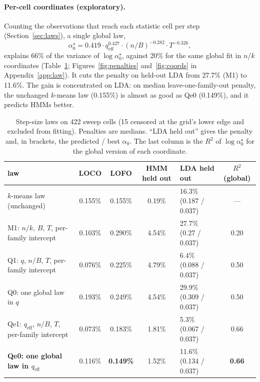 \documentclass[10pt]{article}
\newcommand{\aopt}{\alpha_0^{\star}}
\newcommand{\qeff}{q_{\mathrm{eff}}}
\begin{document}
\paragraph{Per-cell coordinates (exploratory).} Counting the observations that reach each statistic cell per step
(Section~\ref{sec:laws}), a single global law,
\begin{equation}
  \aopt = 0.419 \cdot \qeff^{0.427} \cdot (n/B)^{-0.282} \cdot T^{-0.326},
\end{equation}
explains 66\% of the variance of $\log\aopt$, against 20\% for the same global fit in $n/k$ coordinates
(Table~\ref{tab:laws}; Figures~\ref{fig:penalties} and~\ref{fig:coords} in Appendix~\ref{app:law}). It cuts the penalty on held-out LDA from
27.7\% (M1) to 11.6\%. The gain is concentrated on LDA: on median leave-one-family-out penalty, the unchanged
$k$-means law (0.155\%) is almost as good as Qe0 (0.149\%), and it predicts HMMs better.

\begin{table}[!htbp]
\centering\small
\caption{Step-size laws on 422 sweep cells (15 censored at the grid's lower edge and excluded from fitting).
Penalties are medians. ``LDA held out'' gives the penalty and, in brackets, the predicted / best $\alpha_0$. The last
column is the $R^2$ of $\log\aopt$ for the global version of each coordinate.}
\label{tab:laws}
\setlength{\tabcolsep}{4pt}
\begin{tabular}{p{4.6cm}cccp{3.0cm}c}
\toprule
law & LOCO & LOFO & HMM held out & LDA held out & $R^2$ (global) \\
\midrule
$k$-means law (unchanged) & 0.155\% & 0.155\% & 0.19\% & 16.3\% (0.187 / 0.037) & --- \\
M1: $n/k$, $B$, $T$, per-family intercept & 0.103\% & 0.290\% & 4.54\% & 27.7\% (0.27 / 0.037) & 0.20 \\
Q1: $q$, $n/B$, $T$, per-family intercept & 0.076\% & 0.225\% & 4.79\% & 6.4\% (0.088 / 0.037) & 0.50 \\
Q0: one global law in $q$ & 0.193\% & 0.249\% & 4.54\% & 29.9\% (0.309 / 0.037) & 0.50 \\
Qe1: $\qeff$, $n/B$, $T$, per-family intercept & 0.073\% & 0.183\% & 1.81\% & 5.3\% (0.067 / 0.037) & 0.66 \\
\textbf{Qe0: one global law in $\qeff$} & 0.116\% & \textbf{0.149\%} & 1.52\% & 11.6\% (0.134 / 0.037) &
\textbf{0.66} \\
\bottomrule
\end{tabular}
\end{table}
\end{document}
